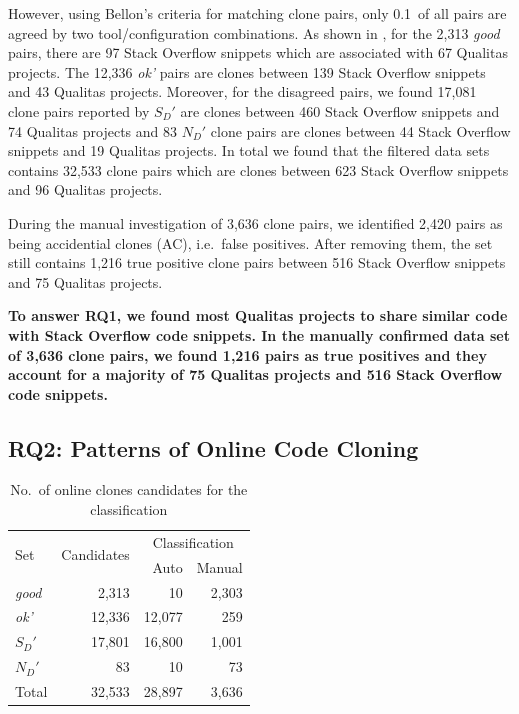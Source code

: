 \documentclass[sigconf,review, anonymous]{acmart}
\newcommand\FIXME[1]{\textbf{FIXME: #1}}
\begin{document}
However, using Bellon's criteria for matching clone pairs, only
0.1\textperthousand~of all pairs are agreed by two tool/configuration
combinations. As shown in , for the 2,313
\textit{good} pairs, there are 97 Stack Overflow snippets which are
associated with 67 Qualitas projects. The 12,336 \textit{ok'} pairs
are clones between 139 Stack Overflow snippets and 43 Qualitas
projects.  Moreover, for the disagreed pairs, we found 17,081 clone
pairs reported by $S_D'$ are clones between 460 Stack Overflow
snippets and 74 Qualitas projects and 83 $N_D'$ clone pairs are clones
between 44 Stack Overflow snippets and 19 Qualitas projects. In total
we found that the filtered data sets contains 32,533 clone pairs which
are clones between 623 Stack Overflow snippets and 96 Qualitas
projects. 

During the manual investigation of 3,636 clone pairs, we identified 2,420 pairs
as being accidential clones (AC), i.e.~false positives. After removing
them, the set still contains 1,216 true positive clone pairs between 516 Stack
Overflow snippets and 75 Qualitas projects.

\textbf{To answer RQ1, we found most Qualitas projects to share
  similar code with Stack Overflow code snippets. In the manually confirmed 
  data set of 3,636 clone pairs, we found 1,216 pairs as true positives and 
  they account for a majority of 75 Qualitas projects and
  516 Stack Overflow code snippets.}


\subsection{RQ2: Patterns of Online Code Cloning}

\begin{table}
	\centering
	\caption{No.~of online clones candidates for the classification}
	\label{tab:online_clone_classification_results}
	\begin{tabular}{l|r|r|r}
		\hline
		\multirow{2}{*}{Set} & \multirow{2}{*}{Candidates} & \multicolumn{2}{c}{Classification} \\ \cline{3-4}
		& & Auto & Manual \\
		\hline 
		\multirow{1}{*}{\textit{good}} & 2,313 & 10 & 2,303 \\
		\multirow{1}{*}{\textit{ok'}} & 12,336 & 12,077 & 259 \\
		\multirow{1}{*}{$S_D'$} & 17,801 & 16,800 & 1,001 \\
		\multirow{1}{*}{$N_D'$} & 83 & 10 & 73 \\ 
		\hline
		Total  & 32,533 & 28,897 & 3,636 \\ 
		\hline
	\end{tabular} %
\end{table}
\end{document}
